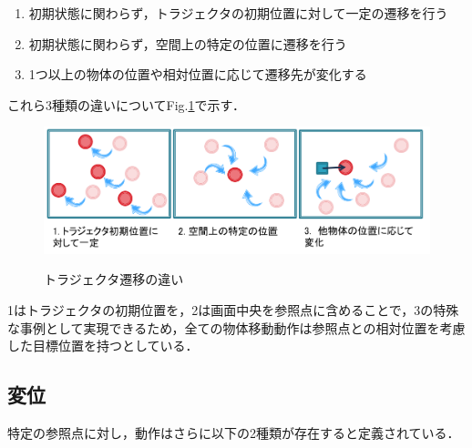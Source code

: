 	\begin{enumerate}
		\item 初期状態に関わらず，トラジェクタの初期位置に対して一定の遷移を行う
		\item 初期状態に関わらず，空間上の特定の位置に遷移を行う
		\item 1つ以上の物体の位置や相対位置に応じて遷移先が変化する
	\end{enumerate}
これら3種類の違いについてFig.\ref{figure:2_moving_trajector}で示す．
	\begin{figure}[h]
		\begin{center}
			\includegraphics[width=14cm]{figure1.png} \\ %
			\caption{トラジェクタ遷移の違い}
			\label{figure:2_moving_trajector}
		\end{center}
	\end{figure}
1はトラジェクタの初期位置を，2は画面中央を参照点に含めることで，3の特殊な事例として実現できるため，全ての物体移動動作は参照点との相対位置を考慮した目標位置を持つとしている．

\subsection{変位}

特定の参照点に対し，動作はさらに以下の2種類が存在すると定義されている．

